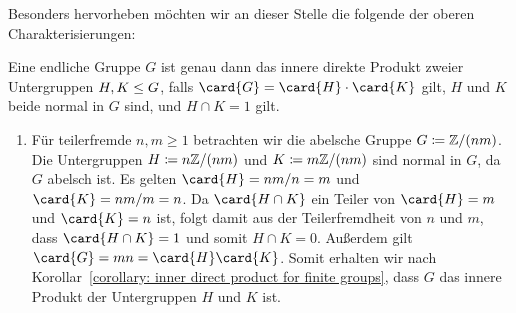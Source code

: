 Besonders hervorheben möchten wir an dieser Stelle die folgende der oberen Charakterisierungen:

\begin{corollary}
  \label{corollary: inner direct product for finite groups}
  Eine endliche Gruppe $G$ ist genau dann das innere direkte Produkt zweier Untergruppen $H, K \leq G$, falls $\card{G} = \card{H} \cdot \card{K}$ gilt, $H$ und $K$ beide normal in $G$ sind, und $H \cap K = 1$ gilt.
\end{corollary}

\begin{example}
  \leavevmode
  \begin{enumerate}
    \item
      Für teilerfremde $n, m \geq 1$ betrachten wir die abelsche Gruppe $G \coloneqq \mathbb{Z}/(nm)$.
      Die Untergruppen $H \coloneqq n\mathbb{Z}/(nm)$ und $K \coloneqq m\mathbb{Z}/(nm)$ sind normal in $G$, da $G$ abelsch ist.
      Es gelten $\card{H} = nm/n = m$ und $\card{K} = nm/m = n$.
      Da $\card{H \cap K}$ ein Teiler von $\card{H} = m$ und $\card{K} = n$ ist, folgt damit aus der Teilerfremdheit von $n$ und $m$, dass $\card{H \cap K} = 1$ und somit $H \cap K = 0$.
      Außerdem gilt $\card{G} = mn = \card{H} \card{K}$.
      Somit erhalten wir nach Korollar~\ref{corollary: inner direct product for finite groups}, dass $G$ das innere Produkt der Untergruppen $H$ und $K$ ist.
      

\end{enumerate}
\end{example}
